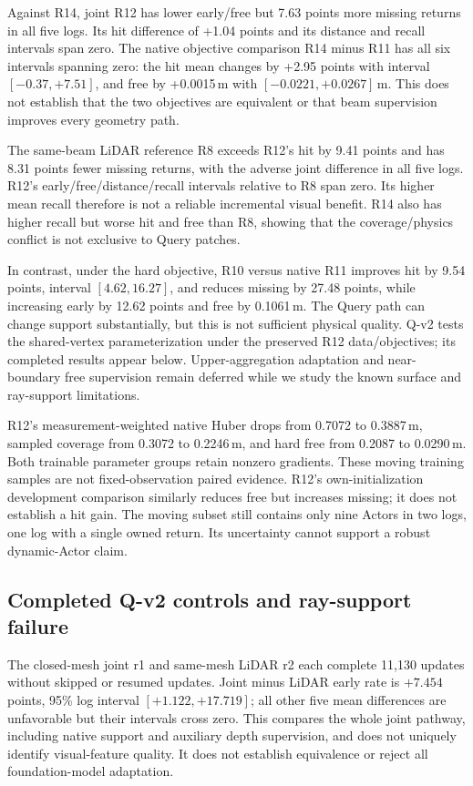 \documentclass[10pt,a4paper]{article}
\begin{document}
Against R14, joint R12 has lower early/free but 7.63 points more missing
returns in all five logs. Its hit difference of +1.04 points and its distance
and recall intervals span zero. The native objective comparison R14 minus R11
has all six intervals spanning zero: the hit mean changes by +2.95 points
with interval $[-0.37,+7.51]$, and free by +0.0015\,m with
$[-0.0221,+0.0267]$\,m. This does not establish that the two objectives are
equivalent or that beam supervision improves every geometry path.

The same-beam LiDAR reference R8 exceeds R12's hit by 9.41 points and has
8.31 points fewer missing returns, with the adverse joint difference in all
five logs. R12's early/free/distance/recall intervals relative to R8 span
zero. Its higher mean recall therefore is not a reliable incremental visual
benefit. R14 also has higher recall but worse hit and free than R8, showing
that the coverage/physics conflict is not exclusive to Query patches.

In contrast, under the hard objective, R10 versus native R11 improves hit by
9.54 points, interval $[4.62,16.27]$, and reduces missing by 27.48 points,
while increasing early by 12.62 points and free by 0.1061\,m. The Query path
can change support substantially, but this is not sufficient physical quality.
Q-v2 tests the shared-vertex parameterization under the preserved R12
data/objectives; its completed results appear below. Upper-aggregation
adaptation and near-boundary free supervision remain deferred while we
study the known surface and ray-support limitations.

R12's measurement-weighted native Huber drops from 0.7072 to 0.3887\,m,
sampled coverage from 0.3072 to 0.2246\,m, and hard free from 0.2087 to
0.0290\,m. Both trainable parameter groups retain nonzero gradients.
These moving training samples are not fixed-observation paired evidence.
R12's own-initialization development comparison similarly reduces free
but increases missing; it does not establish a hit gain. The moving subset
still contains only nine Actors in two logs, one log with a single owned
return. Its uncertainty cannot support a robust dynamic-Actor claim.


\subsection{Completed Q-v2 controls and ray-support failure}
The closed-mesh joint r1 and same-mesh LiDAR r2 each complete 11,130 updates
without skipped or resumed updates. Joint minus LiDAR early rate is
$+7.454$ points, 95\% log interval $[+1.122,+17.719]$; all other five
mean differences are unfavorable but their intervals cross zero. This
compares the whole joint pathway, including native support and auxiliary
depth supervision, and does not uniquely identify visual-feature quality.
It does not establish equivalence or reject all foundation-model adaptation.
\end{document}
